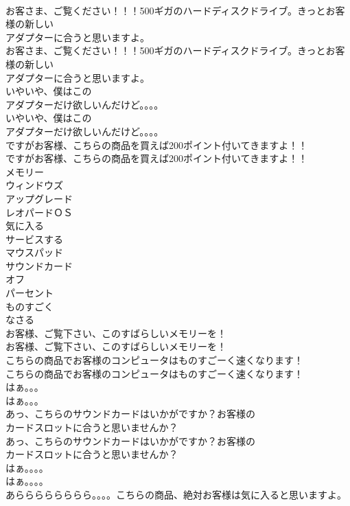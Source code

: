 \documentclass[8pt]{extreport}
\begin{document}
\begin{CJK}{UTF8}{min}
\\	お客さま、ご覧ください！！！500ギガのハードディスクドライブ。きっとお客様の新しい
\\	アダプターに合うと思いますよ。	
\\	お客さま、ご覧ください！！！500ギガのハードディスクドライブ。きっとお客様の新しい
\\	アダプターに合うと思いますよ。 
\\	いやいや、僕はこの
\\	アダプターだけ欲しいんだけど。。。。	
\\	いやいや、僕はこの
\\	アダプターだけ欲しいんだけど。。。。 
\\	ですがお客様、こちらの商品を買えば200ポイント付いてきますよ！！	
\\	ですがお客様、こちらの商品を買えば200ポイント付いてきますよ！！ 
\\	メモリー
\\	ウィンドウズ
\\	アップグレード
\\	レオパードＯＳ
\\	気に入る
\\	サービスする
\\	マウスパッド
\\	サウンドカード
\\	オフ
\\	パーセント
\\	ものすごく
\\	なさる
\\	お客様、ご覧下さい、このすばらしいメモリーを！	
\\	お客様、ご覧下さい、このすばらしいメモリーを！ 
\\	こちらの商品でお客様のコンピュータはものすごーく速くなります！	
\\	こちらの商品でお客様のコンピュータはものすごーく速くなります！ 
\\	はぁ。。。	
\\	はぁ。。。 
\\	あっ、こちらのサウンドカードはいかがですか？お客様の
\\	カードスロットに合うと思いませんか？	
\\	あっ、こちらのサウンドカードはいかがですか？お客様の
\\	カードスロットに合うと思いませんか？ 
\\	はぁ。。。。	
\\	はぁ。。。。 
\\	あらららららららら。。。。こちらの商品、絶対お客様は気に入ると思いますよ。	

\end{CJK}
\end{document}
